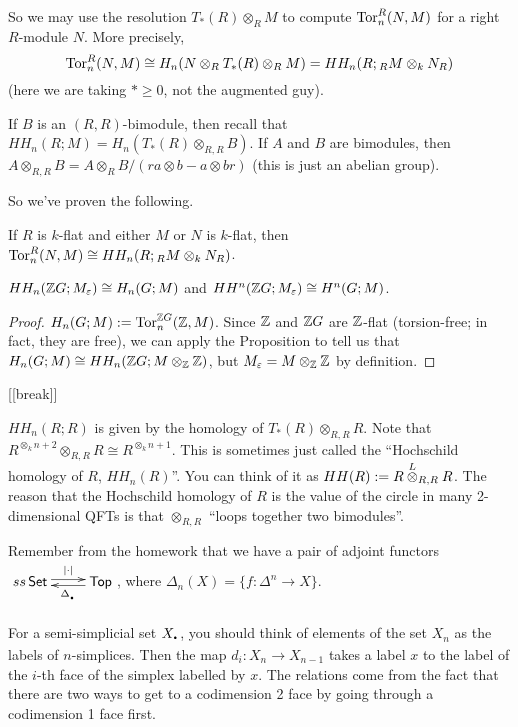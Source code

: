 So we may use the resolution $T_*(R)\otimes_R M$ to compute $\operatorname{Tor}_n^R(N,M)$ for a right $R$-module $N$. More precisely,
\[
 \operatorname{Tor}_n^R(N,M) \cong H_n(N\otimes_R T_*(R)\otimes_R M)= HH_n(R; {}_RM\otimes_k N_R)
\]
(here we are taking $*\ge 0$, not the augmented guy).

If $B$ is an $(R,R)$-bimodule, then recall that $HH_n(R;M)=H_n(T_*(R)\otimes_{R,R} B)$. If $A$ and $B$ are bimodules, then $A\otimes_{R,R}B = A\otimes_R B/(ra\otimes b-a\otimes br)$ (this is just an abelian group).

So we've proven the following.
\begin{proposition}
 If $R$ is $k$-flat and either $M$ or $N$ is $k$-flat, then  $\operatorname{Tor}_n^R(N,M) \cong HH_n(R; {}_RM\otimes_k N_R)$.
\end{proposition}

\begin{theorem}
 $HH_n(\mathbb{Z} G; M_\varepsilon)\cong H_n(G;M)$ and $HH^n(\mathbb{Z} G;M_\varepsilon)\cong H^n(G;M)$.
\end{theorem}
\begin{proof}
 $H_n(G;M):=\operatorname{Tor}_n^{\mathbb{Z} G}(\mathbb{Z},M)$. Since $\mathbb{Z}$ and $\mathbb{Z} G$ are $\mathbb{Z}$-flat (torsion-free; in fact, they are free), we can apply the Proposition to tell us that $H_n(G;M)\cong HH_n(\mathbb{Z} G;M\otimes_{\mathbb{Z}} \mathbb{Z})$, but $M_\varepsilon= M\otimes_{\mathbb{Z}} \mathbb{Z}$ by definition.
 
\end{proof}

[[break]]

\begin{remark}
 $HH_n(R;R)$ is given by the homology of $T_*(R)\otimes_{R,R}R$. Note that $R^{\otimes_k n+2}\otimes_{R,R} R\cong R^{\otimes_k n+1}$. This is sometimes just called the ``Hochschild homology of $R$, $HH_n(R)$''. You can think of it as $HH(R):=R\overset{L}{\otimes}_{R,R} R$. The reason that the Hochschild homology of $R$ is the value of the circle in many 2-dimensional QFTs is that $\otimes_{R,R}$ ``loops together two bimodules''.
\end{remark}


Remember from the homework that we have a pair of adjoint functors $\xymatrix{ss\set \ar@<.5ex>[r]^-{|\cdot |} & \top \ar@<.5ex>[l]^-{\Delta_\udot}}$, where $\Delta_n(X)=\{f\colon \Delta^n\to X\}$. 

For a semi-simplicial set $X_\udot$, you should think of elements of the set $X_n$ as the labels of $n$-simplices. Then the map $d_i\colon X_n\to X_{n-1}$ takes a label $x$ to the label of the $i$-th face of the simplex labelled by $x$. The relations come from the fact that there are two ways to get to a codimension 2 face by going through a codimension 1 face first.

